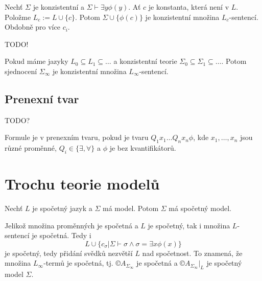 \documentclass[12pt]{article}                   %
\begin{document}
        \begin{lemma}
            Nechť $\Sigma$ je konzistentní a $\Sigma \vdash \exists y\phi(y)$. Ať $c$ je konstanta, která není v $L$. Položme $L_c := L \cup \{c\}$. Potom $\Sigma \cup \{\phi(c)\}$ je konzistentní množina $L_c$-sentencí. Obdobně pro více $c_i$.
        \end{lemma}

        \begin{lemma}
            TODO!
        \end{lemma}

        \begin{lemma}
            Pokud máme jazyky $L_0 \subseteq L_1 \subseteq …$ a konzistentní teorie $\Sigma_0 \subseteq \Sigma_1 \subseteq …$. Potom sjednocení $\Sigma_{∞}$ je konzistentní množina $L_{∞}$-sentencí.
        \end{lemma}

    
    \subsection{Prenexní tvar}

        TODO?

        \begin{definice}
            Formule je v prenexním tvaru, pokud je tvaru $Q_1x_1…Q_nx_n\phi$, kde $x_1, …, x_n$ jsou různé proměnné, $Q_i \in \{\exists, \forall\}$ a $\phi$ je bez kvantifikátorů.
        \end{definice}


\section{Trochu teorie modelů}
    \begin{veta}
        Nechť $L$ je spočetný jazyk a $\Sigma$ má model. Potom $\Sigma$ má spočetný model.

        \begin{dukazin}
            Jelikož množina proměnných je spočetná a $L$ je spočetný, tak i množina $L$-sentencí je spočetná. Tedy i 
            $$ L \cup \{c_\sigma | \Sigma \vdash \sigma \land \sigma = \exists x \phi(x) \} $$ 
            je spočetný, tedy přidání svědků nezvětší $L$ nad spočetnost. To znamená, že množina $L_{∞}$-termů je spočetná, tj. $©A_{\Sigma_{∞}}$ je spočetná a $©A_{\Sigma_{∞}}|_L$ je spočetný model $\Sigma$.
        \end{dukazin}
    \end{veta}
\end{document}
